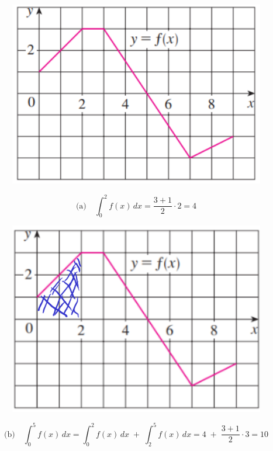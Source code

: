 \begin{figure}[H]
    \centering
    \includegraphics[scale=0.3]{images/integral1.png}
\end{figure}

\[
\text{(a)} \quad \int_{0}^{2} f(x)\,dx 
= \frac{3 + 1}{2} \cdot 2 
= 4
\]

\begin{figure}[H]
    \centering
    \includegraphics[scale=0.3]{images/integral2.png}
\end{figure}

\[
\text{(b)} \quad \int_{0}^{5} f(x)\,dx 
= \int_{0}^{2} f(x)\,dx \;+\; \int_{2}^{5} f(x)\,dx 
= 4 \;+\; \frac{3 + 1}{2} \cdot 3 
= 10
\]

